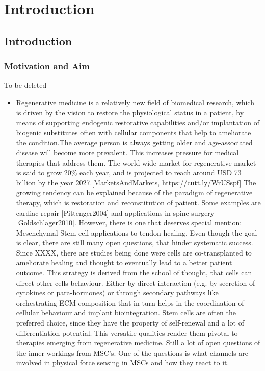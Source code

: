 \newcommand{\package}{\emph}


\chapter{Introduction}

\section{Introduction}
\subsection{Motivation and Aim}
\label{sec:motivation}
To be deleted 
\begin{itemize}
    \item Regenerative medicine is a relatively new field of biomedical research, which is driven by the vision to restore the physiological status in a patient, by means of supporting endogenic restorative capabilities and/or implantation of biogenic substitutes often with cellular components that help to ameliorate the condition.The average person is always getting older and age-associated disease will become more prevalent. This increases pressure for medical therapies that address them. The world wide market for regenerative market is said to grow 20\% each year, and is projected to reach around USD 73 billion by the year 2027.[MarketsAndMarkets, https://cutt.ly/WrUSspf] The growing tendency can be explained because of the paradigm of regenerative therapy, which is restoration and reconstitution of patient. Some examples are cardiac repair [Pittenger2004] and applications in spine-surgery [Goldschlager2010]. However, there is one that deserves special mention: Mesenchymal Stem cell applications to tendon healing. Even though the goal is clear, there are still many open questions, that hinder systematic success. Since XXXX, there are studies being done were cells are co-transplanted to ameliorate healing and thought to eventually lead to a better patient outcome. This strategy is derived from the school of thought, that cells can direct other cells behaviour. Either by direct interaction (e.g. by secretion of cytokines or para-hormones) or through secondary pathways like orchestrating ECM-composition that in turn helps in the coordination of cellular behaviour and implant biointegration. Stem cells are often the preferred choice, since they have the property of self-renewal and a lot of differentiation potential. 
 This versatile qualities render them pivotal to therapies emerging from regenerative medicine. Still a lot of open questions of the inner workings from MSC's. One of the questions is what channels are involved in physical force sensing in MSCs and how they react to it. 
\end{itemize}


